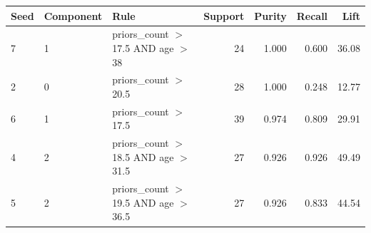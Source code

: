 \begin{tabular}{lllrrrr}
\hline
Seed & Component & Rule & Support & Purity & Recall & Lift \\
\hline
7 & 1 & priors\_count $>$ 17.5 AND age $>$ 38 & 24 & 1.000 & 0.600 & 36.08 \\
2 & 0 & priors\_count $>$ 20.5 & 28 & 1.000 & 0.248 & 12.77 \\
6 & 1 & priors\_count $>$ 17.5 & 39 & 0.974 & 0.809 & 29.91 \\
4 & 2 & priors\_count $>$ 18.5 AND age $>$ 31.5 & 27 & 0.926 & 0.926 & 49.49 \\
5 & 2 & priors\_count $>$ 19.5 AND age $>$ 36.5 & 27 & 0.926 & 0.833 & 44.54 \\
\hline
\end{tabular}